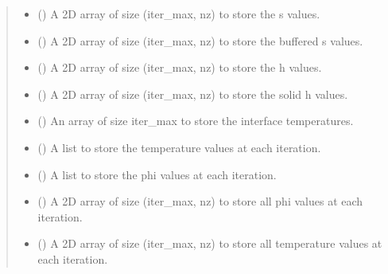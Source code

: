 \documentclass[a4paper,11pt,english,openany]{sphinxmanual}
\begin{document}
\begin{fulllineitems}
\begin{fulllineitems}
\begin{quote}
\begin{description}
\begin{itemize}
\item {} 
\sphinxAtStartPar
{} () \textendash{} A 2D array of size (iter\_max, nz) to store the s values.

\item {} 
\sphinxAtStartPar
{} () \textendash{} A 2D array of size (iter\_max, nz) to store the buffered s values.

\item {} 
\sphinxAtStartPar
{} () \textendash{} A 2D array of size (iter\_max, nz) to store the h values.

\item {} 
\sphinxAtStartPar
{} () \textendash{} A 2D array of size (iter\_max, nz) to store the solid h values.

\item {} 
\sphinxAtStartPar
{} () \textendash{} An array of size iter\_max to store the interface temperatures.

\item {} 
\sphinxAtStartPar
{} () \textendash{} A list to store the temperature values at each iteration.

\item {} 
\sphinxAtStartPar
{} () \textendash{} A list to store the phi values at each iteration.

\item {} 
\sphinxAtStartPar
{} () \textendash{} A 2D array of size (iter\_max, nz) to store all phi values at each iteration.

\item {} 
\sphinxAtStartPar
{} () \textendash{} A 2D array of size (iter\_max, nz) to store all temperature values at each iteration.


\end{itemize}
\end{description}
\end{quote}
\end{fulllineitems}
\end{fulllineitems}
\end{document}
